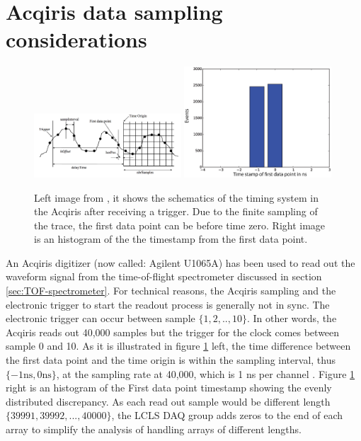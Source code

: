 \section{Acqiris data sampling considerations}
\begin{figure}
	\centering
		\includegraphics[width=0.49\textwidth]{images/Acqiris-waveform-readout.png}
		\includegraphics[width=0.49\textwidth]{images/firstDataPoint.eps}
	\caption[First data point in Acqiris sampling.]{Left image from \citep{Acqiris-manual}, it shows the schematics of the timing system in the Acqiris after receiving a trigger. Due to the finite sampling of the trace, the first data point can be before time zero. Right image is an histogram of the the timestamp from the first data point.}
	\label{fig:Acqiris-waveform-readout}
\end{figure}
An Acqiris digitizer (now called: Agilent U1065A) has been used to read out the waveform signal from the time-of-flight spectrometer discussed in section \ref{sec:TOF-spectrometer}. For technical reasons, the Acqiris sampling and the electronic trigger to start the readout process is generally not in sync. The electronic trigger can occur between sample $\{1,2,..,10\}$. In other words, the Acqiris reads out 40,000 samples but the trigger for the clock comes between sample 0 and 10. As it is illustrated in figure \ref{fig:Acqiris-waveform-readout} left, the time difference between the first data point and the time origin is within the sampling interval, thus $\{-1 \text{ns}, 0 \text{ns}\}$, at the sampling rate at 40,000, which is 1 ns per channel \citep{Acqiris-manual}. Figure \ref{fig:Acqiris-waveform-readout} right is an histogram of the First data point timestamp showing the evenly distributed discrepancy. As each read out sample would be different length $\{39991,39992,...,40000\}$, the LCLS DAQ group adds zeros to the end of each array to simplify the analysis of handling arrays of different lengths.\\

